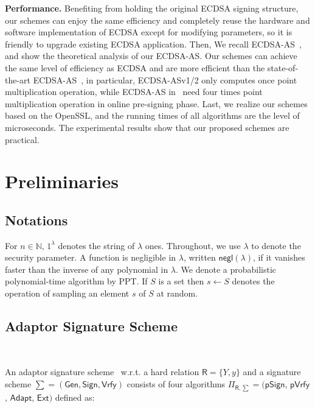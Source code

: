 \documentclass{llncs}
\begin{document}
\begin{trivlist}
\item \textbf{Performance.} Benefiting from holding the original ECDSA signing structure, our schemes can enjoy the same efficiency and completely reuse the hardware and software implementation of ECDSA except for modifying parameters, so it is friendly to upgrade existing ECDSA application. Then, We recall ECDSA-AS~\cite{Moreno-Sanchez2018,AumayrEEFHMMR20}, and show the theoretical analysis of our ECDSA-AS. Our schemes can achieve the same level of efficiency as ECDSA and are more efficient than the state-of-the-art ECDSA-AS~\cite{Moreno-Sanchez2018,AumayrEEFHMMR20}, in particular, ECDSA-ASv1/2 only computes once point multiplication operation, while ECDSA-AS in~\cite{Moreno-Sanchez2018,AumayrEEFHMMR20} need four times point multiplication operation in online pre-signing phase. Last, we realize our schemes based on the OpenSSL, and the running times of all algorithms are the level of microseconds. The experimental results show that our proposed schemes are practical.
\end{trivlist}

\section{Preliminaries}
\subsection{Notations}

For $n\in \mathbb{N}$, $1^\lambda$ denotes the string of $\lambda$ ones. Throughout, we use $\lambda$ to denote the security parameter. A function is negligible in $\lambda$, written $\mathsf{negl}(\lambda)$, if it vanishes faster than the inverse of any polynomial in $\lambda$. We denote a probabilistic polynomial-time algorithm by PPT. If $S$ is a set then $s\leftarrow S$ denotes the operation of sampling an element $s$ of $S$ at random.

\subsection{Adaptor Signature Scheme}~\label{Adaptor Signature Scheme}

An adaptor signature scheme~\cite{AumayrEEFHMMR20} w.r.t. a hard relation $\mathsf{R}=\{Y,y\}$ and a signature scheme $\sum = (\mathsf{Gen}, \mathsf{Sign}, \mathsf{Vrfy})$ consists of four algorithms $\Pi_{\mathsf{R},\sum} = ($$\mathsf{pSign}$, $\mathsf{pVrfy}$, $\mathsf{Adapt}$, $\mathsf{Ext})$ defined as:
\end{document}
